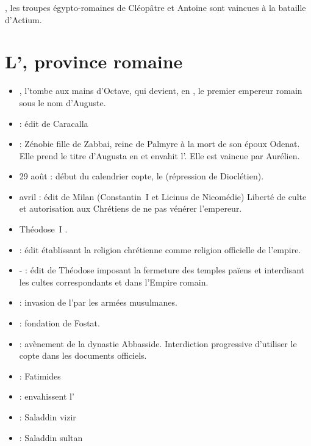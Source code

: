 , les troupes égypto-romaines de Cléopâtre et Antoine sont 
vaincues à la bataille d'Actium.

\section{L'\kmt, province romaine}

\begin{itemize}\setlength\itemsep{0.8\baselineskip}
  \item {}, l'\kmt tombe aux mains d'Octave, qui devient, 
        en , le premier empereur romain sous le nom d'Auguste.
  \item {} : édit de Caracalla
  \item {} : Zénobie fille de Zabbai, reine de Palmyre à 
        la mort de son époux Odenat. Elle prend le titre d'Augusta en 
         et envahit l'\kmt. Elle est vaincue par Aurélien.
  \item 29 août  : début du calendrier copte, le 
         (répression de Dioclétien).
  \item avril  : édit de Milan (Constantin~I\ier{} 
         et Licinus de Nicomédie) 
        Liberté de culte et autorisation aux Chrétiens de ne pas 
        vénérer l'empereur.
  \item Théodose~I\ier{} .
  \item {} : édit établissant la religion chrétienne comme 
        religion officielle de l'empire.
  \item {}- : édit de Théodose imposant la 
        fermeture des temples païens et interdisant les cultes 
        correspondants et dans l'Empire romain.
  \item {} : invasion de l'\kmt par les armées musulmanes.
  \item {} : fondation de Fostat.
  \item {} : avènement de la dynastie Abbasside. 
        Interdiction progressive d'utiliser le copte dans les 
        documents officiels.

  \item {} : Fatimides
  \item {} : envahissent l'\kmt
  \item {} : Saladdin vizir
  \item {} : Saladdin sultan
\end{itemize}

